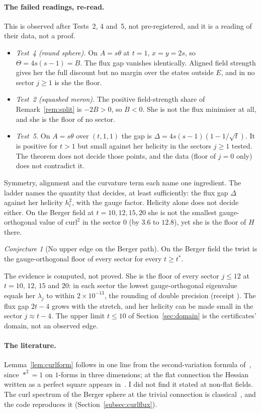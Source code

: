 \documentclass[11pt]{article}
\theoremstyle{definition}
\theoremstyle{remark}
\newtheorem{conjecture}[theorem]{Conjecture}
\begin{document}
\paragraph{The failed readings, re-read.} This is observed after Tests~2, 4 and~5, not pre-registered, and it is a
reading of their data, not a proof.
\begin{itemize}
  \item \emph{Test~4 (round sphere).} On $A=s\theta$ at $t=1$, $x=y=2s$, so $\Theta=4s(s-1)=B$. The flux gap vanishes
    identically. Aligned field strength gives her the full discount but no margin over the states outside $E$, and in
    no sector $j\ge1$ is she the floor.
  \item \emph{Test~2 (squashed meron).} The positive field-strength share of Remark~\ref{rem:split} is $-2B>0$, so
    $B<0$. She is not the flux minimiser at all, and she is the floor of no sector.
  \item \emph{Test~5.} On $A=s\theta$ over $(t,1,1)$ the gap is $\Delta=4s(s-1)(1-1/\sqrt t)$. It is positive for $t>1$
    but small against her helicity in the sectors $j\ge1$ tested. The theorem does not decide those points, and the
    data (floor of $j=0$ only) does not contradict it.
\end{itemize}
Symmetry, alignment and the curvature term each name one ingredient. The ladder names the quantity that decides,
at least sufficiently: the flux gap $\Delta$ against her helicity $h_l^2$, with the gauge factor. Helicity alone does not
decide either. On the Berger field at $t=10,12,15,20$ she is not the smallest gauge-orthogonal value of $\mathrm{curl}^2$
in the sector $0$ (by $3.6$ to $12.8$), yet she is the floor of $H$ there.

\begin{conjecture}[No upper edge on the Berger path]\label{conj:noupper}
On the Berger field the twist is the gauge-orthogonal floor of every sector for every $t\ge t^*$.
\end{conjecture}
The evidence is computed, not proved. She is the floor of every sector $j\le12$ at $t=10$, $12$, $15$ and $20$:
in each sector the lowest gauge-orthogonal eigenvalue equals her $\lambda_j$ to within $2\times10^{-13}$, the rounding
of double precision (receipt ). The flux gap $2t-4$ grows with the stretch, and her helicity can be made small in the sector
$j\approx t-4$. The upper limit $t\le10$ of Section~\ref{sec:domain} is the certificates' domain, not an observed edge.

\paragraph{The literature.} Lemma~\ref{lem:curlform} follows in one line from the second-variation formula
of~\cite{bl1981}, since $\ast^2=1$ on $1$-forms in three dimensions; at the flat connection the Hessian written as a
perfect square appears in~\cite[eq.~(6)]{vandenheuvel1996}. I did not find it stated at non-flat fields. The curl
spectrum of the Berger sphere at the trivial connection is classical~\cite{gibbons1980,capoferrivassiliev2026}, and the
code reproduces it (Section~\ref{subsec:curlflux}).
\end{document}
